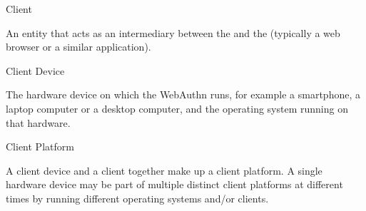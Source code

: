  Client

An entity that acts as an intermediary between the  and the  (typically a web browser or a similar application).


 Client Device

The hardware device on which the WebAuthn  runs, for example a smartphone, a laptop computer or a desktop computer, and the operating system running on that hardware.


 Client Platform

A client device and a client together make up a client platform. A single hardware device may be part of multiple distinct client platforms at different times by running different operating systems and/or clients.
